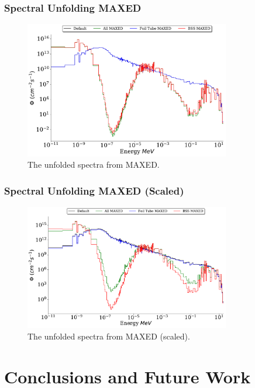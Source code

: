 \documentclass[fleqn]{beamer}
\begin{document}
\begin{frame}
\frametitle{Spectral Unfolding MAXED}

\begin{figure}
\centering
\includegraphics[width = 0.8\textwidth]{unfolded_mx}
\caption{The unfolded spectra from MAXED.}
\end{figure}

\end{frame}

\begin{frame}
\frametitle{Spectral Unfolding MAXED (Scaled)}

\begin{figure}
\centering
\includegraphics[width = 0.8\textwidth]{unfolded_mx_sc}
\caption{The unfolded spectra from MAXED (scaled).}
\end{figure}

\end{frame}

\section{Conclusions and Future Work}
\end{document}
